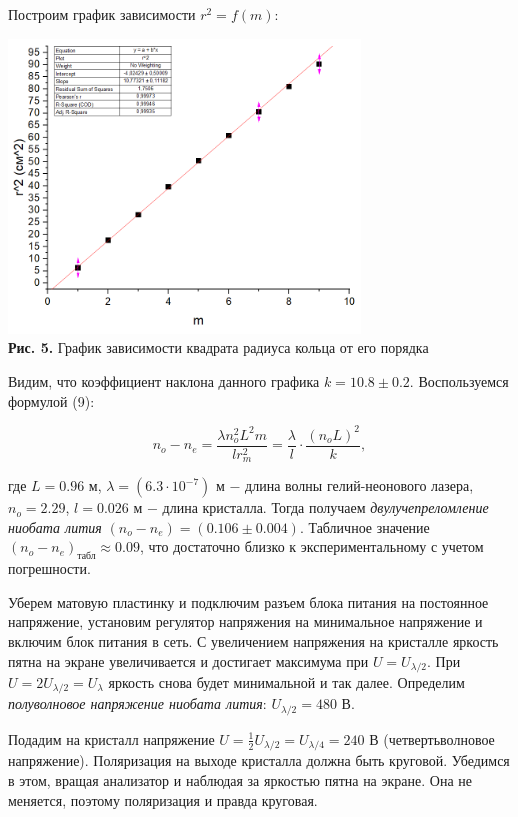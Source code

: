 \documentclass[a4paper,12pt]{article} %
\begin{document}
\hfill \break Построим график зависимости $r^2 = f(m)$:

\begin{center}
\includegraphics[width=0.70\textwidth]{4.7.2_5.png}\\
\textbf{Рис. 5.} График зависимости квадрата радиуса кольца от его порядка \\
\end{center}

\hfill \break Видим, что коэффициент наклона данного графика $k = 10.8 \pm 0.2$. Воспользуемся формулой (9): 

$$
n_{o} - n_{e} = \frac {\lambda n_{o}^2 L^2 m} {l r_{m}^2} = \frac {\lambda}{l} \cdot \frac {(n_{o}L)^2} {k},
$$

\hfill \break где $L = 0.96$ м, $\lambda = (6.3 \cdot 10^{-7})$ м $-$ длина волны гелий-неонового лазера, $n_{o} = 2.29$, $l = 0.026$ м $-$ длина кристалла. Тогда получаем \textit{двулучепреломление ниобата лития} $(n_{o} - n_{e}) = (0.106 \pm 0.004)$. Табличное значение $(n_{o} - n_{e})_{\text{табл}} \approx 0.09$, что достаточно близко к экспериментальному с учетом погрешности.

\hfill \break Уберем матовую пластинку и подключим разъем блока питания на постоянное напряжение, установим регулятор напряжения на минимальное напряжение и включим блок питания в сеть. С увеличением напряжения на кристалле яркость пятна на экране увеличивается и достигает максимума при $U = U_{\lambda/2}$. При $U = 2U_{\lambda/2} = U_{\lambda}$ яркость снова будет минимальной и так далее. Определим \textit{полуволновое напряжение ниобата лития}: $U_{\lambda/2} = 480$ В. 

\hfill \break Подадим на кристалл напряжение $U = \frac{1}{2} U_{\lambda/2} = U_{\lambda/4} = 240$ В (четвертьволновое напряжение). Поляризация на выходе кристалла должна быть круговой. Убедимся в этом, вращая анализатор и наблюдая за яркостью пятна на экране. Она не меняется, поэтому поляризация и правда круговая. 
\end{document}
